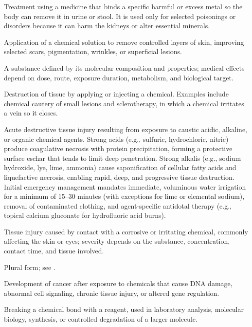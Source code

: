  Treatment using a medicine that binds a specific harmful or excess metal so the body can remove it in urine or stool. It is used only for selected poisonings or disorders because it can harm the kidneys or alter essential minerals.

 Application of a chemical solution to remove controlled layers of skin, improving selected scars, pigmentation, wrinkles, or superficial lesions.

 A substance defined by its molecular composition and properties; medical effects depend on dose, route, exposure duration, metabolism, and biological target.

 Destruction of tissue by applying or injecting a chemical. Examples include chemical cautery of small lesions and sclerotherapy, in which a chemical irritates a vein so it closes.

 Acute destructive tissue injury resulting from exposure to caustic acidic, alkaline, or organic chemical agents. Strong acids (e.g., sulfuric, hydrochloric, nitric) produce coagulative necrosis with protein precipitation, forming a protective surface eschar that tends to limit deep penetration. Strong alkalis (e.g., sodium hydroxide, lye, lime, ammonia) cause saponification of cellular fatty acids and liquefactive necrosis, enabling rapid, deep, and progressive tissue destruction. Initial emergency management mandates immediate, voluminous water irrigation for a minimum of 15--30 minutes (with exceptions for lime or elemental sodium), removal of contaminated clothing, and agent-specific antidotal therapy (e.g., topical calcium gluconate for hydrofluoric acid burns).

 Tissue injury caused by contact with a corrosive or irritating chemical, commonly affecting the skin or eyes; severity depends on the substance, concentration, contact time, and tissue involved.

 Plural form; see .

 Development of cancer after exposure to chemicals that cause DNA damage, abnormal cell signaling, chronic tissue injury, or altered gene regulation.

 Breaking a chemical bond with a reagent, used in laboratory analysis, molecular biology, synthesis, or controlled degradation of a larger molecule.

